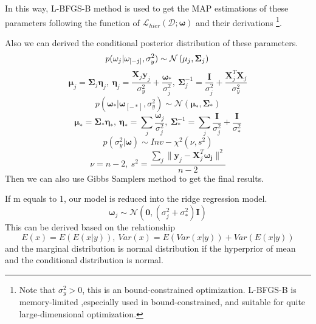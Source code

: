 \documentclass[paper=a4, fontsize=11pt]{scrartcl}
\numberwithin{equation}{section}		%
\numberwithin{figure}{section}			%
\numberwithin{table}{section}				%
\begin{document}
In this way, L-BFGS-B method is used to get the MAP estimations of these parameters following the function of  $\mathcal{L}_{hier}(\mathcal{D};\mathbf{\omega})$ and their derivations
\footnote{Note that $\sigma_{y}^2>0$, this is an bound-constrained optimization. L-BFGS-B is memory-limited ,especially used in bound-constrained, and suitable for quite large-dimensional optimization.}.

Also we can derived the conditional posterior distribution of these parameters. \\
\begin{equation}
p(\mathbf{\omega}_j|\mathbf{\omega}_{[-j]},\sigma_{y}^2) \sim \mathcal{N}\left(\mathbf{\mu}_j,\mathbf{\Sigma}_j\right)\\
\end{equation}
\begin{equation*}
  \mathbf{\mu}_j = \mathbf{\Sigma}_j\mathbf{\eta}_j,~
   \mathbf{\eta}_j = \frac{\mathbf{X}_j\mathbf{y}_j}{\sigma_{y}^2}+\frac{\mathbf{\omega}_{\ast}}{\sigma_{j}^2},~
   \mathbf{\Sigma}_j^{-1} = \frac{\mathbf{I}}{\sigma_{j}^2}+\frac{\mathbf{X}_{j}^T\mathbf{X}_j}{\sigma_{y}^2}
\end{equation*}
\begin{equation}
    p(\mathbf{\omega}_{\ast}|\mathbf{\omega}_{[-\ast]},\sigma_{y}^2) \sim \mathcal{N}\left(\mathbf{\mu_{\ast}},\mathbf{\Sigma}_{\ast}\right)
\end{equation}
\begin{equation*}
    \mathbf{\mu_{\ast}} = \mathbf{\Sigma}_{\ast}\mathbf{\eta}_{\ast},~
    \mathbf{\eta}_{\ast} = \sum_j\frac{\mathbf{\omega}_j}{\sigma_j^2},~
    \mathbf{\Sigma}_{\ast}^{-1} = \sum_j\frac{\mathbf{I}}{\sigma_j^2}+\frac{\mathbf{I}}{\sigma_{\ast}^2}
\end{equation*}
\begin{equation}
    p(\sigma_{y}^2|\mathbf{\omega}) \sim Inv-\chi^2(\nu,s^2)
\end{equation}
\begin{equation*}
    \nu = n-2,~
    s^2 = \frac{\sum_{j}\parallel\mathbf{y}_j-\mathbf{X}_j^T\mathbf{\omega_j}\parallel^2}{n-2}
\end{equation*}
Then we can also use Gibbs Samplers method to get the final results.

If m equals to 1, our model is reduced into the ridge regression model.
\begin{equation}
  \mathbf{\omega}_j \sim \mathcal{N}\left(\mathbf{0},(\sigma^2_j+\sigma_{\ast}^2)\mathbf{I}\right)
\end{equation}
This can be derived based on the relationship
\begin{equation}
E(x) = E\left(E(x|y)\right),~ \textit{Var}(x) = E\left(\textit{Var}(x|y)\right) + \textit{Var}\left(E(x|y)\right)
\end{equation}
and the marginal distribution is normal distribution if the hyperprior of mean and the conditional distribution is normal.
\newpage
\end{document}
